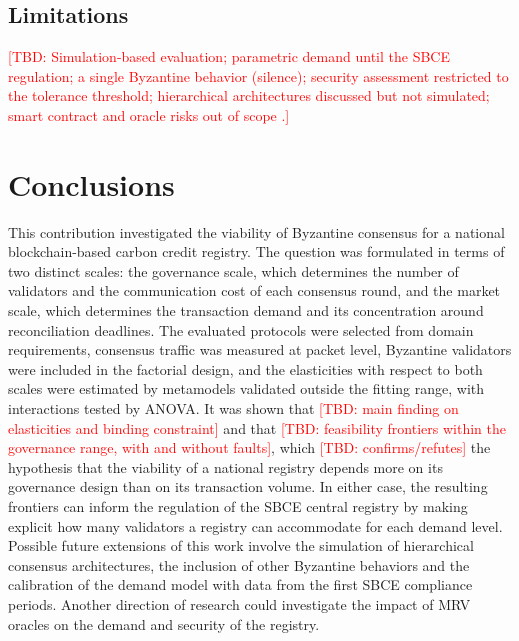 \documentclass[english]{sbc2025}%
\newcommand{\tbd}[1]{\textcolor{red}{[TBD: #1]}}
\begin{document}
\subsection{Limitations}

\tbd{Simulation-based evaluation; parametric demand until the SBCE regulation; a single Byzantine behavior (silence); security assessment restricted to the tolerance threshold; hierarchical architectures discussed but not simulated; smart contract and oracle risks out of scope \citep{GhiyamiPour2025,Rahman2023}.}

\section{Conclusions}
\label{sec:conclusion}

This contribution investigated the viability of Byzantine consensus for a national blockchain-based carbon credit registry. The question was formulated in terms of two distinct scales: the governance scale, which determines the number of validators and the communication cost of each consensus round, and the market scale, which determines the transaction demand and its concentration around reconciliation deadlines. The evaluated protocols were selected from domain requirements, consensus traffic was measured at packet level, Byzantine validators were included in the factorial design, and the elasticities with respect to both scales were estimated by metamodels validated outside the fitting range, with interactions tested by ANOVA. It was shown that \tbd{main finding on elasticities and binding constraint} and that \tbd{feasibility frontiers within the governance range, with and without faults}, which \tbd{confirms/refutes} the hypothesis that the viability of a national registry depends more on its governance design than on its transaction volume. In either case, the resulting frontiers can inform the regulation of the SBCE central registry by making explicit how many validators a registry can accommodate for each demand level. Possible future extensions of this work involve the simulation of hierarchical consensus architectures, the inclusion of other Byzantine behaviors and the calibration of the demand model with data from the first SBCE compliance periods. Another direction of research could investigate the impact of MRV oracles on the demand and security of the registry.
\end{document}
